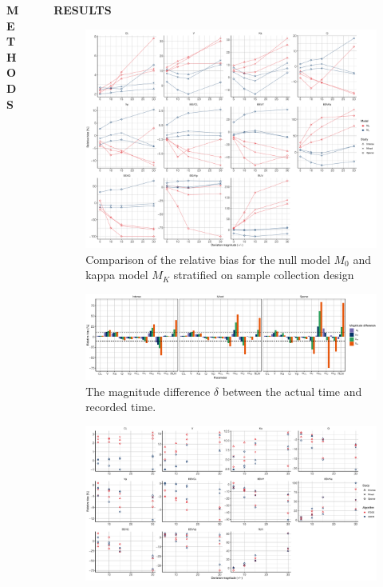 \documentclass[final]{beamer}
\newlength{\sepwidth}
\newlength{\colwidth}
\newcommand{\separatorcolumn}{\begin{column}{\sepwidth}\end{column}}
\begin{document}
\begin{frame}[t]
\begin{columns}[t]
\begin{column}{\colwidth}
\begin{block}{\textbf{METHODS}}
  \end{block}

\end{column}
\separatorcolumn

\begin{column}{0.6\paperwidth}
\begin{block}{\textbf{RESULTS}}
\begin{figure}
\centering
\includegraphics[width=55cm]{Figure1A}
\caption{Comparison of the relative bias for the null model $M_0$ and kappa model $M_K$ stratified on sample collection design}
\end{figure}
\begin{figure}
\centering
\includegraphics[width=55cm]{Figure3A.eps}
\caption{The magnitude difference $\delta$ between the actual time and recorded time.}
\end{figure}
\begin{figure}
\centering
\includegraphics[width=55cm]{Figure4.eps}

\end{figure}
\end{block}
\end{column}
\end{columns}
\end{frame}
\end{document}
